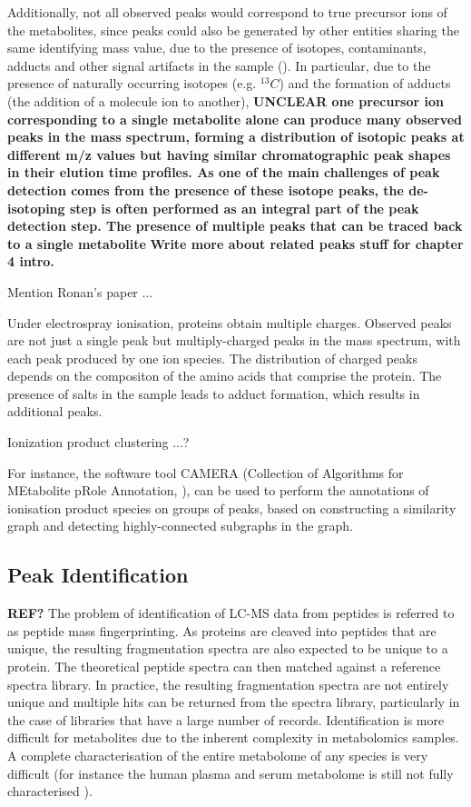 Additionally, not all observed peaks would correspond to true precursor ions of the metabolites, since peaks could also be generated by other entities sharing the same identifying mass value, due to the presence of isotopes, contaminants, adducts and other signal artifacts in the sample (\cite{Keller2008}). In particular, due to the presence of naturally occurring isotopes (e.g. $^{13}C$) and the formation of adducts (the addition of a molecule ion to another), \textbf{UNCLEAR one precursor ion corresponding to a single metabolite alone can produce many observed peaks in the mass spectrum, forming a distribution of isotopic peaks at different m/z values but having similar chromatographic peak shapes in their elution time profiles. As one of the main challenges of peak detection comes from the presence of these isotope peaks, the de-isotoping step is often performed as an integral part of the peak detection step. The presence of multiple peaks that can be traced back to a single metabolite} \textbf{Write more about related peaks stuff for chapter 4 intro.}

Mention Ronan's paper ...

Under electrospray ionisation, proteins obtain multiple charges. Observed peaks are not just a single peak but multiply-charged peaks in the mass spectrum, with each peak produced by one ion species. The distribution of charged peaks depends on the compositon of the amino acids that comprise the protein. The presence of salts in the sample leads to adduct formation, which results in additional peaks. 

Ionization product clustering ...?

For instance, the software tool CAMERA (Collection of Algorithms for MEtabolite pRole Annotation, \cite{Kuhl2012}), can be used to perform the annotations of ionisation product species on groups of peaks, based on constructing a similarity graph and detecting highly-connected subgraphs in the graph. 

\subsection{Peak Identification\label{sub:identification-background}}

\textbf{REF?}
The problem of identification of LC-MS data from peptides is referred to as peptide mass fingerprinting. As proteins are cleaved into peptides that are unique, the resulting fragmentation spectra are also expected to be unique to a protein. The theoretical peptide spectra can then matched against a reference spectra library. In practice, the resulting fragmentation spectra are not entirely unique and multiple hits can be returned from the spectra library, particularly in the case of libraries that have a large number of records. Identification is more difficult for metabolites due to the inherent complexity in metabolomics samples. A complete characterisation of the entire metabolome of any species is very difficult (for instance the human plasma and serum metabolome is still not fully characterised \cite{dunn2011procedures}). 

